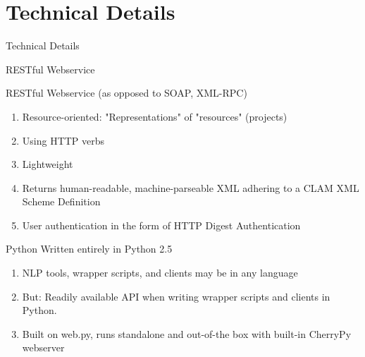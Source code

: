 \documentclass[compress]{beamer}
\begin{document}
\section{Technical Details}

\begin{frame}{Technical Details}


    \begin{block}{RESTful Webservice}
        
        RESTful Webservice (as opposed to SOAP, XML-RPC)

        \begin{enumerate}
            \item Resource-oriented: "Representations" of "resources" (projects)
            \item Using HTTP verbs
            \item Lightweight
            \item Returns human-readable, machine-parseable XML adhering to a CLAM XML Scheme Definition %
            \item User authentication in the form of HTTP Digest Authentication
        \end{enumerate}    
    \end{block}
\end{frame}

\begin{frame}
    \begin{block}{Python}
            Written entirely in Python 2.5

            \begin{enumerate}
                \item NLP tools, wrapper scripts, and clients may be in any language 
                \item But: Readily available API  when writing wrapper scripts and clients in Python.
                \item Built on web.py, runs standalone and out-of-the box with built-in CherryPy webserver        
            \end{enumerate}

    \end{block}
\end{frame}
\end{document}
